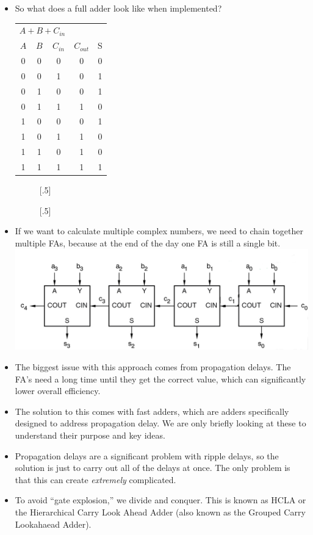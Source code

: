 \documentclass[10pt,a4paper]{article}
\begin{document}
\begin{itemize}
\pagebreak
\item So what does a full adder look like when implemented?\\
\begin{tabular}{ccc|cc}
\multicolumn{3}{c|}{$A+B+C_{in}$} &   &   \\ 
$A$ & $B$ & $C_{in}$ & $C_{out}$ & S \\ 
\hline 
0 & 0 & 0 & 0 & 0 \\ 
0 & 0 & 1 & 0 & 1 \\ 
0 & 1 & 0 & 0 & 1 \\ 
0 & 1 & 1 & 1 & 0 \\ 
1 & 0 & 0 & 0 & 1 \\ 
1 & 0 & 1 & 1 & 0 \\ 
1 & 1 & 0 & 1 & 0 \\ 
1 & 1 & 1 & 1 & 1 \\  
\end{tabular} 
\begin{figure}[h]
\captionsetup[subfigure]{font=footnotesize}
[.5\textwidth]{
}
[.5\textwidth]
{}
\end{figure}
\item If we want to calculate multiple complex numbers, we need to chain together multiple FAs, because at the end of the day one FA is still a single bit.\\
\includegraphics[scale=.7]{IMG6}
\item The biggest issue with this approach comes from propagation delays. The FA's need a long time until they get the correct value, which can significantly lower overall efficiency.
\item The solution to this comes with fast adders, which are adders specifically designed to address propagation delay. We are only briefly looking at these to understand their purpose and key ideas.
\item Propagation delays are a significant problem with ripple delays, so the solution is just to carry out all of the delays at once. The only problem is that this can create \textit{extremely} complicated. 
\item To avoid ``gate explosion,'' we divide and conquer. This is known as HCLA or the Hierarchical Carry Look Ahead Adder (also known as the Grouped Carry Lookahaead Adder). 
\end{itemize}
\pagebreak
\end{document}
